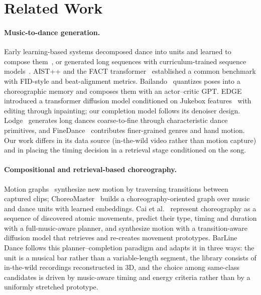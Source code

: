\documentclass[10pt]{article}
\begin{document}
\section{Related Work}
\label{sec:related}

\paragraph{Music-to-dance generation.}
Early learning-based systems decomposed dance into units and learned to compose them~\cite{lee2019dancing}, or generated long sequences with curriculum-trained sequence models~\cite{huang2021dancerevolution}.
AIST++ and the FACT transformer~\cite{li2021aist} established a common benchmark with FID-style and beat-alignment metrics.
Bailando~\cite{siyao2022bailando} quantizes poses into a choreographic memory and composes them with an actor--critic GPT.
EDGE~\cite{tseng2023edge} introduced a transformer diffusion model conditioned on Jukebox features~\cite{dhariwal2020jukebox,castellon2021jukemir} with editing through inpainting; our completion model follows its denoiser design.
Lodge~\cite{li2024lodge} generates long dances coarse-to-fine through characteristic dance primitives, and FineDance~\cite{li2023finedance} contributes finer-grained genres and hand motion.
Our work differs in its data source (in-the-wild video rather than motion capture) and in placing the timing decision in a retrieval stage conditioned on the song.

\paragraph{Compositional and retrieval-based choreography.}
Motion graphs~\cite{kovar2002motiongraphs} synthesize new motion by traversing transitions between captured clips; ChoreoMaster~\cite{chen2021choreomaster} builds a choreography-oriented graph over music and dance units with learned embeddings.
Cai et al.~\cite{cai2026atomic} represent choreography as a sequence of discovered atomic movements, predict their type, timing and duration with a full-music-aware planner, and synthesize motion with a transition-aware diffusion model that retrieves and re-creates movement prototypes.
BarLine Dance follows this planner--completion paradigm and adapts it in three ways: the unit is a musical bar rather than a variable-length segment, the library consists of in-the-wild recordings reconstructed in 3D, and the choice among same-class candidates is driven by music-aware timing and energy criteria rather than by a uniformly stretched prototype.
\end{document}

